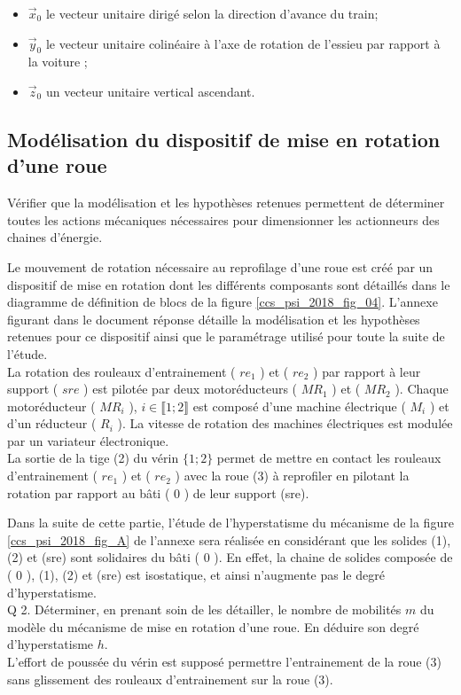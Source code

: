 \begin{itemize}
  \item $\vec{x}_{0}$ le vecteur unitaire dirigé selon la direction d'avance du train;
  \item $\vec{y}_{0}$ le vecteur unitaire colinéaire à l'axe de rotation de l'essieu par rapport à la voiture ;
  \item $\vec{z}_{0}$ un vecteur unitaire vertical ascendant.
\end{itemize}

\subsection{Modélisation du dispositif de mise en rotation d'une roue}
\begin{obj}
Vérifier que la modélisation et les hypothèses retenues permettent de déterminer toutes les actions mécaniques nécessaires pour dimensionner les actionneurs des chaines d'énergie.
\end{obj}

Le mouvement de rotation nécessaire au reprofilage d'une roue est créé par un dispositif de mise en rotation dont les différents composants sont détaillés dans le diagramme de définition de blocs de la figure \ref{ccs_psi_2018_fig_04}. L'annexe figurant dans le document réponse détaille la modélisation et les hypothèses retenues pour ce dispositif ainsi que le paramétrage utilisé pour toute la suite de l'étude.\\
La rotation des rouleaux d'entrainement ( $r e_{1}$ ) et ( $r e_{2}$ ) par rapport à leur support ( $s r e$ ) est pilotée par deux motoréducteurs ( $M R_{1}$ ) et ( $M R_{2}$ ). Chaque motoréducteur ( $M R_{i}$ ), $i \in \llbracket 1 ; 2 \rrbracket$ est composé d'une machine électrique ( $M_{i}$ ) et d'un réducteur ( $R_{i}$ ). La vitesse de rotation des machines électriques est modulée par un variateur électronique.\\
La sortie de la tige (2) du vérin $\{1 ; 2\}$ permet de mettre en contact les rouleaux d'entrainement ( $r e_{1}$ ) et ( $r e_{2}$ ) avec la roue (3) à reprofiler en pilotant la rotation par rapport au bâti ( 0 ) de leur support (sre).

Dans la suite de cette partie, l'étude de l'hyperstatisme du mécanisme de la figure \ref{ccs_psi_2018_fig_A} de l'annexe sera réalisée en considérant que les solides (1), (2) et (sre) sont solidaires du bâti ( 0 ). En effet, la chaine de solides composée de ( 0 ), (1), (2) et (sre) est isostatique, et ainsi n'augmente pas le degré d'hyperstatisme.\\
Q 2. Déterminer, en prenant soin de les détailler, le nombre de mobilités $m$ du modèle du mécanisme de mise en rotation d'une roue. En déduire son degré d'hyperstatisme $h$.\\
L'effort de poussée du vérin est supposé permettre l'entrainement de la roue (3) sans glissement des rouleaux d'entrainement sur la roue (3).\\

